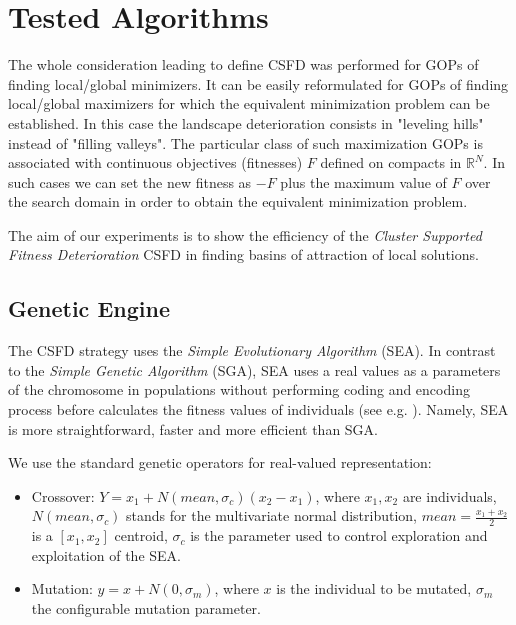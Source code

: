 
\chapter{Tested Algorithms}
\label{sec:testFun}

\vspace{5pt}
\begin{remark}
\label{rem:plusminus}
The whole consideration leading to define CSFD was performed for
GOPs of finding local/global minimizers.
It can be easily reformulated for GOPs of finding
local/global maximizers for which the equivalent minimization problem
can be established.
In this case the landscape deterioration consists in "leveling hills" 
instead of "filling valleys".
The particular class of such maximization GOPs is associated with continuous
objectives (fitnesses) $F$ defined on compacts in $\mathbb{R}^N$.
In such cases we can set the new fitness as $- F$ plus the maximum value 
of $F$ over the search domain
in order to obtain the equivalent minimization problem.
\end{remark}


The aim of our experiments is to show the efficiency of the 
\textit{Cluster Supported Fitness Deterioration} CSFD in finding 
basins of attraction of local solutions.


\section{Genetic Engine}
\label{sec:genEng}
The CSFD strategy uses the \textit{Simple Evolutionary Algorithm} (SEA).
In contrast to the \textit{Simple Genetic Algorithm} (SGA), 
SEA uses a real values as a parameters of the chromosome
in populations without performing coding and encoding
process before calculates the fitness values of individuals 
(see e.g. \cite{Schaefer2007}).
Namely, SEA is more straightforward, faster and more efficient than SGA.


We use the standard genetic operators for real-valued representation:
\begin{itemize}
  \item Crossover: $Y=x_1 + N(mean, \sigma_c)(x_2 - x_1)$, where $x_1, x_2$ are
  individuals, $N(mean, \sigma_c)$ stands for the multivariate normal
  distribution, $mean = \frac{x_1 + x_2}{2}$ is a $[x_1, x_2]$ centroid, 
  $\sigma_c$ is the parameter used to control exploration 
  and exploitation of the SEA.
  \item Mutation: $y = x + N(0, \sigma_m)$, where $x$ is the individual to be
  mutated, $\sigma_m$ the configurable mutation parameter.
\end{itemize}

